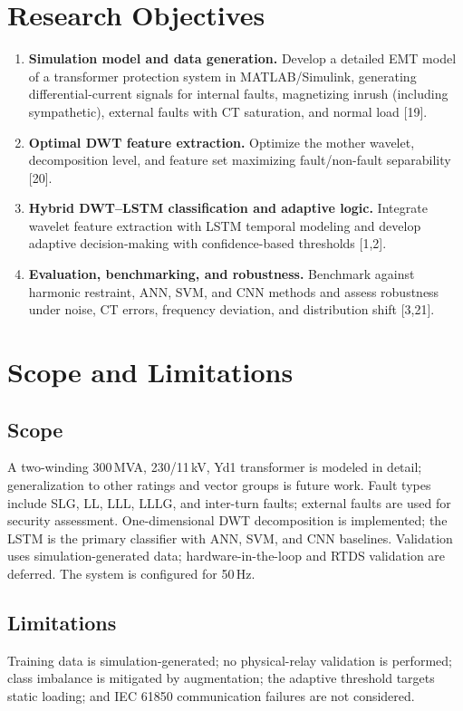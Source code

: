 \documentclass[12pt,a4paper,oneside]{report}
\begin{document}
\section{Research Objectives}
\begin{enumerate}[leftmargin=1.6em,itemsep=2pt]
\item \textbf{Simulation model and data generation.} Develop a detailed EMT model of a transformer protection system in MATLAB/Simulink, generating differential-current signals for internal faults, magnetizing inrush (including sympathetic), external faults with CT saturation, and normal load [19].
\item \textbf{Optimal DWT feature extraction.} Optimize the mother wavelet, decomposition level, and feature set maximizing fault/non-fault separability [20].
\item \textbf{Hybrid DWT--LSTM classification and adaptive logic.} Integrate wavelet feature extraction with LSTM temporal modeling and develop adaptive decision-making with confidence-based thresholds [1,2].
\item \textbf{Evaluation, benchmarking, and robustness.} Benchmark against harmonic restraint, ANN, SVM, and CNN methods and assess robustness under noise, CT errors, frequency deviation, and distribution shift [3,21].
\end{enumerate}

\section{Scope and Limitations}
\subsection{Scope}
A two-winding 300\,MVA, 230/11\,kV, Yd1 transformer is modeled in detail; generalization to other ratings and vector groups is future work. Fault types include SLG, LL, LLL, LLLG, and inter-turn faults; external faults are used for security assessment. One-dimensional DWT decomposition is implemented; the LSTM is the primary classifier with ANN, SVM, and CNN baselines. Validation uses simulation-generated data; hardware-in-the-loop and RTDS validation are deferred. The system is configured for 50\,Hz.
\subsection{Limitations}
Training data is simulation-generated; no physical-relay validation is performed; class imbalance is mitigated by augmentation; the adaptive threshold targets static loading; and IEC 61850 communication failures are not considered.
\end{document}
